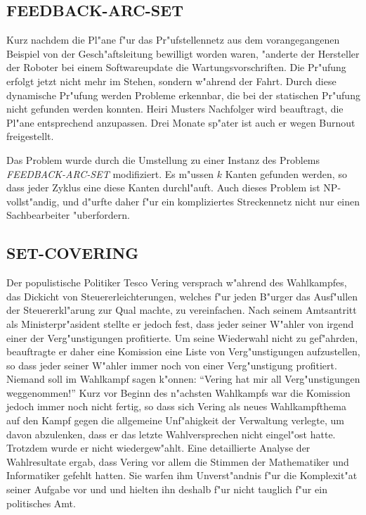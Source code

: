 \subsection{FEEDBACK-ARC-SET}
Kurz nachdem die Pl"ane f"ur das Pr"ufstellennetz aus dem vorangegangenen
Beispiel von der Gesch"aftsleitung bewilligt worden waren, "anderte
der Hersteller der Roboter bei einem Softwareupdate die Wartungsvorschriften.
Die Pr"ufung erfolgt jetzt nicht mehr im Stehen, sondern w"ahrend der
Fahrt.
Durch diese dynamische Pr"ufung werden Probleme erkennbar, die bei der
statischen Pr"ufung nicht gefunden werden konnten. Heiri Musters
Nachfolger wird beauftragt, die Pl"ane entsprechend anzupassen.
Drei Monate sp"ater ist auch er wegen Burnout freigestellt.

\medskip

Das Problem wurde durch die Umstellung zu einer Instanz des
Problems {\it FEEDBACK-ARC-SET} modifiziert.
Es m"ussen $k$ Kanten gefunden werden, so dass jeder Zyklus eine
diese Kanten durchl"auft. Auch dieses Problem ist NP-vollst"andig,
und d"urfte daher f"ur ein kompliziertes Streckennetz
nicht nur einen Sachbearbeiter "uberfordern.

\subsection{SET-COVERING}
Der populistische Politiker Tesco Vering versprach w"ahrend des
Wahlkampfes, das Dickicht von Steuererleichterungen, welches
f"ur jeden B"urger das Ausf"ullen der Steuererkl"arung zur Qual
machte, zu vereinfachen.
Nach seinem Amtsantritt als Ministerpr"asident 
stellte er jedoch fest, dass jeder seiner W"ahler von irgend einer
der Verg"unstigungen profitierte. Um seine Wiederwahl nicht
zu gef"ahrden, beauftragte er daher eine Komission eine Liste
von Verg"unstigungen aufzustellen, so dass jeder seiner W"ahler
immer noch von einer Verg"unstigung profitiert. Niemand soll im
Wahlkampf sagen k"onnen: ``Vering hat mir all Verg"unstigungen weggenommen!''
Kurz vor Beginn des n"achsten Wahlkampfs war die Komission jedoch
immer noch nicht fertig, so dass sich Vering als neues Wahlkampfthema
auf den Kampf gegen die allgemeine Unf"ahigkeit der Verwaltung verlegte,
um davon
abzulenken, dass er das letzte Wahlversprechen nicht eingel"ost hatte.
Trotzdem wurde er nicht wiedergew"ahlt. Eine detaillierte Analyse der
Wahlresultate ergab, dass Vering vor allem die Stimmen der Mathematiker und
Informatiker gefehlt hatten.
Sie warfen ihm Unverst"andnis f"ur die Komplexit"at seiner Aufgabe vor und 
und hielten ihn deshalb f"ur nicht tauglich f"ur ein politisches Amt.


